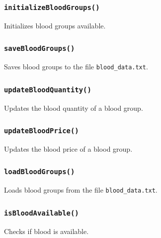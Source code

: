 \documentclass[12pt,a4paper]{report}
\begin{document}
\subsubsection{\texttt{initializeBloodGroups()}}
Initializes blood groups available.


\subsubsection{\texttt{saveBloodGroups()}}
Saves blood groups to the file \texttt{blood\_data.txt}.


\subsubsection{\texttt{updateBloodQuantity()}}
Updates the blood quantity of a blood group.


\subsubsection{\texttt{updateBloodPrice()}}
Updates the blood price of a blood group.


\subsubsection{\texttt{loadBloodGroups()}}
Loads blood groups from the file \texttt{blood\_data.txt}.


\subsubsection{\texttt{isBloodAvailable()}}
Checks if blood is available.

\end{document}
